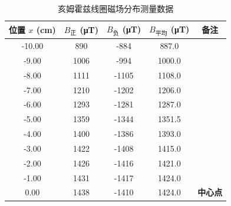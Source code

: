 \documentclass{../../templates/Report}%
\begin{document}
\begin{fullreportonly}
    \begin{table}[H]
        \centering
        \caption{亥姆霍兹线圈磁场分布测量数据}
        \label{tab:hmhz}
        \small
        \begin{tabular}{c c c c c}
            \toprule
            \textbf{位置} $x$ (\si{cm}) & $B_{\text{正}}$ (\si{\micro\tesla}) & $B_{\text{负}}$ (\si{\micro\tesla}) & $B_{\text{平均}}$ (\si{\micro\tesla}) & \textbf{备注}  \\
            \midrule
            -10.00                    & 890                                & -884                               & 887.0                               &              \\
            -9.00                     & 1006                               & -994                               & 1000.0                              &              \\
            -8.00                     & 1111                               & -1105                              & 1108.0                              &              \\
            -7.00                     & 1210                               & -1202                              & 1206.0                              &              \\
            -6.00                     & 1293                               & -1281                              & 1287.0                              &              \\
            -5.00                     & 1359                               & -1344                              & 1351.5                              &              \\
            -4.00                     & 1400                               & -1386                              & 1393.0                              &              \\
            -3.00                     & 1422                               & -1408                              & 1415.0                              &              \\
            -2.00                     & 1426                               & -1416                              & 1421.0                              &              \\
            -1.00                     & 1431                               & -1417                              & 1424.0                              &              \\
            0.00                      & 1438                               & -1410                              & 1424.0                              & \textbf{中心点} \\

\end{tabular}
\end{table}
\end{fullreportonly}
\end{document}
